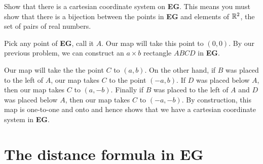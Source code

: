 \documentclass{ximera}
\begin{document}
\begin{problem}
Show that there is a cartesian coordinate system on \textbf{EG}. This
means you must show that there is a bijection between the points in
\textbf{EG} and elements of $\mathbb R^2$, the set of pairs of real numbers.

\begin{freeResponse}
Pick any point of \textbf{EG}, call it $A$. Our map will take this
point to $(0,0)$. By our previous problem, we can construct an
$a\times b$ rectangle $ABCD$ in \textbf{EG}.
\begin{image}
\end{image}
Our map will take the the point $C$ to $(a,b)$. On the other hand, if
$B$ was placed to the left of $A$, our map takes $C$ to the point
$(-a,b)$. If $D$ was placed below $A$, then our map takes $C$ to
$(a,-b)$. Finally if $B$ was placed to the left of $A$ and $D$ was
placed below $A$, then our map takes $C$ to $(-a,-b)$.  By
construction, this map is one-to-one and onto and hence shows that we
have a cartesian coordinate system in \textbf{EG}.
\end{freeResponse}

\end{problem}


\section*{The distance formula in \textbf{EG}}
\end{document}
